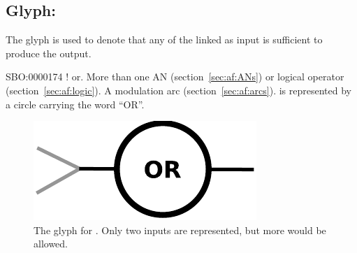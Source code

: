 \subsection{Glyph: }
\label{sec:af:or}

The glyph  is used to denote that any of the  linked as input is sufficient to produce the output.

\begin{glyphDescription}
 \glyphSboTerm SBO:0000174 ! or.
 \glyphOrigin More than one AN (section~\ref{sec:af:ANs}) or logical operator (section~\ref{sec:af:logic}).
 \glyphTarget  A modulation arc (section~\ref{sec:af:arcs}). 
 \glyphNode {} is represented by a circle carrying the word ``OR''.
 \end{glyphDescription}

\begin{figure}[H]
  \centering
  \includegraphics[scale = 0.5]{images/or}
  \caption{The \AF glyph for . Only two inputs are represented, but more would be allowed.}
  \label{fig:af:or}
\end{figure}
